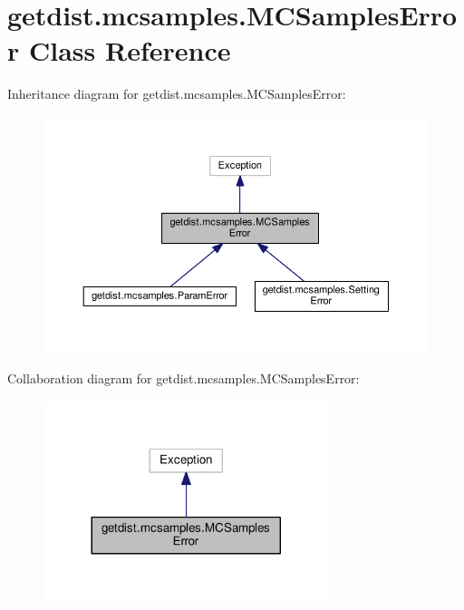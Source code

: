 \hypertarget{classgetdist_1_1mcsamples_1_1MCSamplesError}{}\section{getdist.\+mcsamples.\+M\+C\+Samples\+Error Class Reference}
\label{classgetdist_1_1mcsamples_1_1MCSamplesError}


Inheritance diagram for getdist.\+mcsamples.\+M\+C\+Samples\+Error\+:
\nopagebreak
\begin{figure}[H]
\begin{center}
\leavevmode
\includegraphics[width=350pt]{classgetdist_1_1mcsamples_1_1MCSamplesError__inherit__graph}
\end{center}
\end{figure}


Collaboration diagram for getdist.\+mcsamples.\+M\+C\+Samples\+Error\+:
\nopagebreak
\begin{figure}[H]
\begin{center}
\leavevmode
\includegraphics[width=236pt]{classgetdist_1_1mcsamples_1_1MCSamplesError__coll__graph}
\end{center}
\end{figure}


